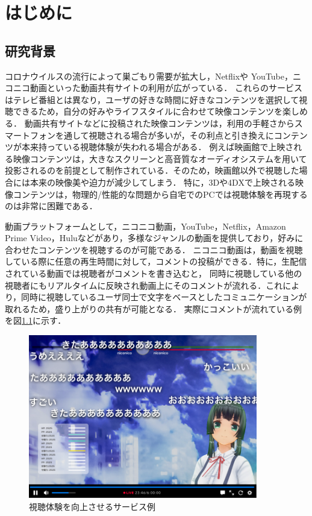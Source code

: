 \chapter{はじめに}
\thispagestyle{myheadings}

\section{研究背景}
コロナウイルスの流行によって巣ごもり需要が拡大し，Netflixや YouTube，ニコニコ動画といった動画共有サイトの利用が広がっている．
これらのサービスはテレビ番組とは異なり，ユーザの好きな時間に好きなコンテンツを選択して視聴できるため，自分の好みやライフスタイルに合わせて映像コンテンツを楽しめる．
動画共有サイトなどに投稿された映像コンテンツは，利用の手軽さからスマートフォンを通して視聴される場合が多いが，その利点と引き換えにコンテンツが本来持っている視聴体験が失われる場合がある．
例えば映画館で上映される映像コンテンツは，大きなスクリーンと高音質なオーディオシステムを用いて投影されるのを前提として制作されている．そのため，映画館以外で視聴した場合には本来の映像美や迫力が減少してしまう．
特に，3Dや4DXで上映される映像コンテンツは，物理的/性能的な問題から自宅でのPCでは視聴体験を再現するのは非常に困難である．

動画プラットフォームとして，ニコニコ動画，YouTube，Netflix，Amazon Prime Video，Huluなどがあり，多様なジャンルの動画を提供しており，好みに合わせたコンテンツを視聴するのが可能である．
ニコニコ動画は，動画を視聴している際に任意の再生時間に対して，コメントの投稿ができる．特に，生配信されている動画では視聴者がコメントを書き込むと，
同時に視聴している他の視聴者にもリアルタイムに反映され動画上にそのコメントが流れる．これにより，同時に視聴しているユーザ同士で文字をベースとしたコミュニケーションが取れるため，盛り上がりの共有が可能となる．
実際にコメントが流れている例を図\ref{nikoniko}に示す．

\begin{figure}[H]
    \centering
    \includegraphics[width=10cm]{images/chapter1/nikoniko_grafu.png}
    \caption{視聴体験を向上させるサービス例\cite{nair}}
    \label{nikoniko}
\end{figure}

